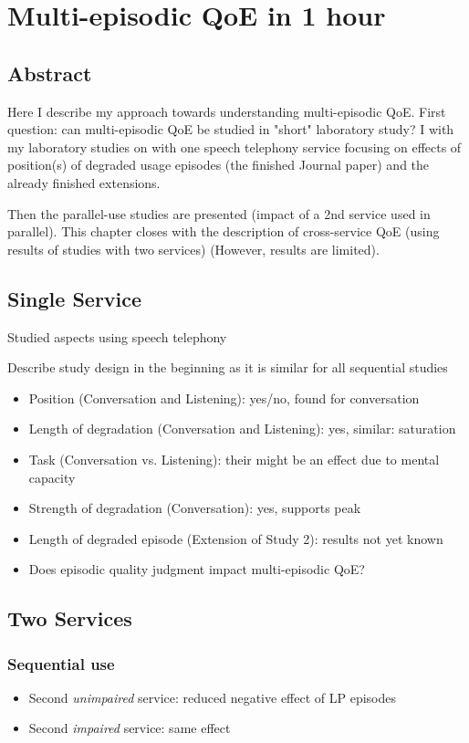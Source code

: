 \chapter{Multi-episodic QoE in 1 hour}\label{chap:06}
\section*{Abstract}
Here I describe my approach towards understanding multi-episodic QoE.
First question: can multi-episodic QoE be studied in "short" laboratory study?
I with my laboratory studies on with one speech telephony service focusing on effects of position(s) of degraded usage episodes (the finished Journal paper) and the already finished extensions.

Then the parallel-use studies are presented (impact of a 2nd service used in parallel).
This chapter closes with the description of cross-service QoE (using results of studies with two services) (However, results are limited).

\section{Single Service}
Studied aspects using speech telephony

Describe study design in the beginning as it is similar for all sequential studies

\begin{itemize}
\item Position (Conversation and Listening): yes/no, found for conversation
\item Length of degradation (Conversation and Listening): yes, similar: saturation
\item Task (Conversation vs. Listening): their might be an effect due to mental capacity
\item Strength of degradation (Conversation): yes, supports peak
\item Length of degraded episode (Extension of Study 2): results not yet known %
\item Does episodic quality judgment impact multi-episodic QoE? %
\end{itemize}

\section{Two Services}
\subsection{Sequential use}
\begin{itemize}
\item Second \textit{unimpaired} service: reduced negative effect of LP episodes
\item Second \textit{impaired} service: same effect
\end{itemize}

